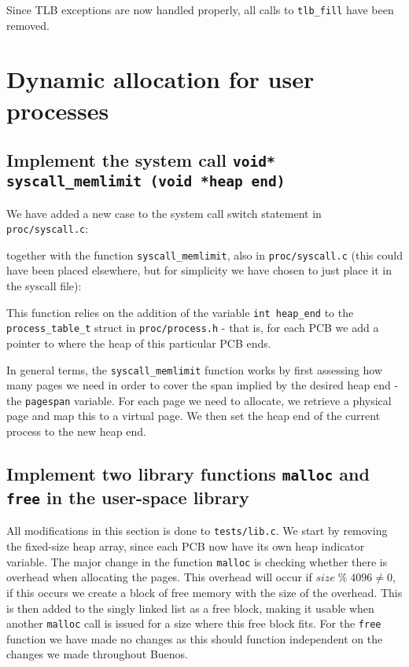 \documentclass[a4paper,12pt]{article}
\begin{document}
Since TLB exceptions are now handled properly, all calls to \texttt{tlb\_fill} have been removed.

\section{Dynamic allocation for user processes}

\subsection{Implement the system call \texttt{void* syscall\_memlimit (void *heap end)}}

We have added a new case to the system call switch statement in \texttt{proc/syscall.c}:

together with the function \texttt{syscall\_memlimit}, also in \texttt{proc/syscall.c} (this could have been placed elsewhere, but for simplicity we have chosen to just place it in the syscall file):


This function relies on the addition of the variable \texttt{int heap\_end} to the \texttt{process\_table\_t} struct in \texttt{proc/process.h} - that is, for each PCB we add a pointer to where the heap of this particular PCB ends.

In general terms, the \texttt{syscall\_memlimit} function works by first assessing how many pages we need in order to cover the span implied by the desired heap end - the \texttt{pagespan} variable. For each page we need to allocate, we retrieve a physical page and map this to a virtual page. We then set the heap end of the current process to the new heap end.

\subsection{Implement two library functions \texttt{malloc} and \texttt{free} in the user-space library}

All modifications in this section is done to \texttt{tests/lib.c}. We start by removing the fixed-size heap array, since each PCB now have its own heap indicator variable. The major change in the function \texttt{malloc} is checking whether there is overhead when allocating the pages. This overhead will occur if $size\; \% \; 4096 \neq 0$, if this occurs we create a block of free memory with the size of the overhead. This is then added to the singly linked list as a free block, making it usable when another \texttt{malloc} call is issued for a size where this free block fits. For the \texttt{free} function we have made no changes as this should function independent on the changes we made throughout Buenos.
\end{document}
